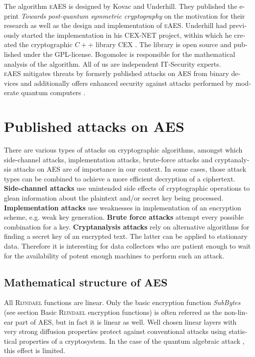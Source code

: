 \documentclass[a4paper,11pt]{article}
\begin{document}
\begin{otherlanguage}{english}
\vspace{0.3cm} 

\noindent
The algorithm \textsc{eAES} is designed by Kovac and Underhill. They published the e-print \textit{Towards post-quantum symmetric cryptography} \cite{KUN} on the motivation for their research as well as the design and implementation of \textsc{eAES}. Underhill had previously started the implementation in his CEX-NET project, within which he created the cryptographic $C++$ library CEX \cite{CEX}. The library is open source and published under the GPL-license. Bogomolec is responsible for the mathematical analysis of the algorithm. All of us are independent IT-Security experts.\\

\noindent
\textsc{eAES} mitigates threats by formerly published attacks on \textsc{AES} from binary devices \cite{HFE,WEI,CRK} and additionally offers enhanced security against attacks performed by moderate quantum computers \cite{GRO,QAA}. \\ 

\section{Published attacks on \textsc{AES}}

\noindent
There are various types of attacks on cryptographic algorithms, amongst which side-channel attacks, implementation attacks, brute-force attacks and cryptanalysis attacks on \textsc{AES} are of importance in our context. In some cases, those attack types can be combined to achieve a more efficient decryption of a ciphertext.\\

\noindent
\textbf{Side-channel attacks} use unintended side effects of cryptographic operations to glean information about the plaintext and/or secret key being processed. \textbf{Implementation attacks} use weaknesses in implementation of an encryption scheme, e.g. weak key generation. \textbf{Brute force attacks} attempt every possible combination for a key. \textbf{Cryptanalysis attacks} rely on alternative algorithms for finding a secret key of an encrypted text. The latter can be applied to stationary data. Therefore it is interesting for data collectors who are patient enough to wait for the availability of potent enough machines to perform such an attack.

\subsection{Mathematical structure of \textsc{AES}}
\noindent
All \textsc{Rijndael} functions are linear. Only the basic encryption function \textit{SubBytes} (see section Basic \textsc{Rijndael} encryption functions) is often referred as the non-linear part of \textsc{AES}, but in fact it is linear as well. Well chosen linear layers with very strong diffusion properties protect against conventional attacks using statistical properties of a cryptosystem. In the case of the quantum algebraic attack \cite{QAA}, this effect is limited.


\end{otherlanguage}
\end{document}
